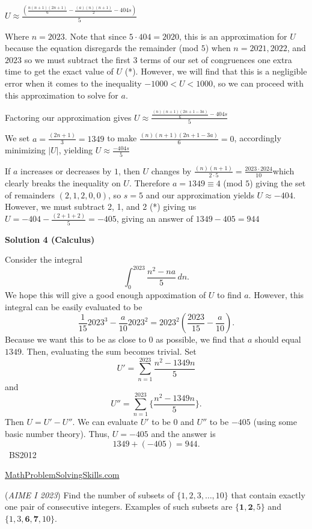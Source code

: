\begin{enumerate}
{{ $U \approx \frac {\left( \frac {n(n+1)(2n+1)}{6} - \frac{(a)(n)(n+1)}{2}  -404s \right)}{5}$

 Where $n=2023$. Note that since $5 \cdot 404=2020$, this is an approximation for $U$ because the equation disregards the remainder (mod $5$) when $n=2021, 2022$, and $2023$ so we must subtract the first 3 terms of our set of congruences one extra time to get the exact value of $U$ (*). However, we will find that this is a negligible error when it comes to the inequality $-1000<U<1000$, so we can proceed with this approximation to solve for $a$. 

 Factoring our approximation gives $U \approx \frac {\frac{(n)(n+1)(2n+1 - 3a)}{6}-404s}{5}$

 
We set $a= \frac{(2n+1)}{3} = 1349$ to make $\frac{(n)(n+1)(2n+1 - 3a)}{6}=0$, accordingly minimizing $|U|$, yielding  $U \approx  \frac{-404s}{5}$

 If $a$ increases or decreases by $1$, then $U$ changes by $\frac {(n)(n+1)}{2 \cdot 5} = \frac {2023 \cdot 2024}{10}$which clearly breaks the inequality on $U$. Therefore $a=1349 \equiv 4$ (mod $5$) giving the set of remainders $(2,1,2,0,0)$, so $s=5$ and our approximation yields $U \approx -404$. However, we must subtract 2, 1, and 2 (*) giving us $U = - 404 - \frac{(2+1+2)}{5} = - 405$, giving an answer of $1349-405= \boxed{944}$




\textbf{Solution 4 (Calculus)}

Consider the integral
 \[\int_{0}^{2023} \dfrac{n^2-na}{5} \, dn.\]We hope this will give a good enough appoximation of $U$ to find $a.$ However, this integral can be easily evaluated to be
 \[\dfrac{1}{15}2023^3-\dfrac{a}{10}2023^2=2023^2\left(\dfrac{2023}{15}-\dfrac{a}{10}\right).\]Because we want this to be as close to $0$ as possible, we find that $a$ should equal $1349.$ Then, evaluating the sum becomes trivial. Set
 \[U'=\sum_{n=1}^{2023}\dfrac{n^2-1349n}{5}\]and
 \[U''=\sum_{n=1}^{2023}\{\dfrac{n^2-1349n}{5}\}.\]Then $U=U'-U''.$ We can evaluate $U'$ to be $0$ and $U''$ to be $-405$ (using some basic number theory). Thus, $U=-405$ and the answer is
 \[1349+(-405)=\boxed{944}.\]~BS2012

 \href{https://mathproblemsolvingskills.wordpress.com/}{MathProblemSolvingSkills.com}

 


	\item (\textit{AIME I 2023}) Find the number of subsets of $\{1,2,3,\ldots,10\}$ that contain exactly one pair of consecutive integers. Examples of such subsets are $\{\mathbf{1},\mathbf{2},5\}$ and $\{1,3,\mathbf{6},\mathbf{7},10\}.$

}}
\end{enumerate}
